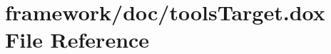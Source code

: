 \hypertarget{tools_target_8dox}{}\section{framework/doc/tools\+Target.dox File Reference}
\label{tools_target_8dox}
